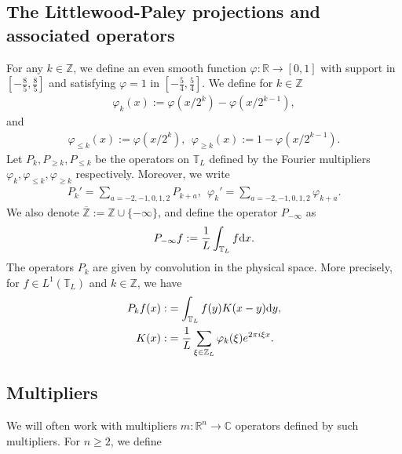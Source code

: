 \documentclass[UTF-8,reqno]{amsart}
\numberwithin{equation}{section}
\theoremstyle{definition}
\def\dif{{\mathord{{\rm d}}}}
\def\geq{\geqslant}
\def\leq{\leqslant}
\def\dif{{\mathord{{\rm d}}}}
\def\geq{\geqslant}
\def\leq{\leqslant}
\begin{document}
 \subsection{The Littlewood-Paley projections and associated operators}
 For any $k\in\mathbb{Z}$, we define  an even smooth function $\varphi:\mathbb{R}\to[0,1]$ with  support in $[-\frac85, \frac85]$ and satisfying $\varphi=1$ in $[-\frac54, \frac54]$. We define for $k\in\mathbb{Z}$
\begin{align*}
    \varphi_k(x):=\varphi(x/2^{k})-\varphi(x/2^{k-1}),
\end{align*}
and
\begin{align*}
     \varphi_{\leq k}(x):=\varphi(x/2^{k}),\ \  \varphi_{\geq k}(x):=1-\varphi(x/2^{k-1}).
\end{align*}
Let $P_k,P_{\geq k}, P_{\leq k }$ be the  operators on $\mathbb{T}_L$ defined by the Fourier multipliers $\varphi_k, \varphi_{\leq k}, \varphi_{\geq k}$ respectively.  Moreover, we write
\begin{align*}
    P_k'=\sum_{a=-2,-1,0,1,2}P_{k+a},\ \  \varphi_k'=\sum_{a=-2,-1,0,1,2}\varphi_{k+a}.
\end{align*}
We also denote $\overline{\mathbb{Z}}:=\mathbb{Z}\cup\{-\infty\}$, and  define the operator $P_{-\infty}$ as
\begin{align*}
    P_{-\infty}f:=\frac{1}{L}\int_{\mathbb{T}_L}f\dif x.
\end{align*}
The operators $P_k$ are given by convolution in the physical space. More precisely, for $f\in L^1(\mathbb{T}_L)$ and $k\in\mathbb{Z}$, we have
\begin{align*}
    P_kf(x):&=\int_{\mathbb{T}_L}f(y)K(x-y)\dif y,\\
    K(x):&=\frac{1}{L}\sum_{\xi\in\mathbb{Z}_L}\varphi_k(\xi)e^{2\pi i\xi x}.
\end{align*}

\subsection{Multipliers }
We will often work with multipliers $m:\mathbb{R}^n\to\mathbb{C}$ operators defined by such multipliers. %
For $n\geq2$, we define
 
\end{document}
